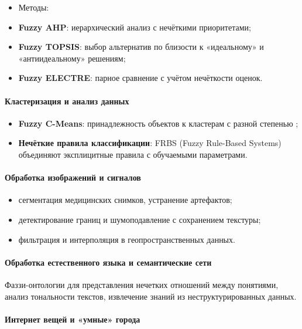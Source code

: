 \begin{itemize}
  \item[] Методы:
  \item \textbf{Fuzzy AHP}: иерархический анализ с нечёткими приоритетами;
  \item \textbf{Fuzzy TOPSIS}: выбор альтернатив по близости к «идеальному» и «антиидеальному» решениям;
  \item \textbf{Fuzzy ELECTRE}: парное сравнение с учётом нечёткости оценок.
\end{itemize}

\paragraph{Кластеризация и анализ данных}
\begin{itemize}
  \item \textbf{Fuzzy C-Means}: принадлежность объектов к кластерам с разной степенью \cite{Bezdek1981};
  \item \textbf{Нечёткие правила классификации}: FRBS (Fuzzy Rule-Based Systems) объединяют эксплицитные правила с обучаемыми параметрами.
\end{itemize}

\paragraph{Обработка изображений и сигналов}
\begin{itemize}
  \item сегментация медицинских снимков, устранение артефактов;
  \item детектирование границ и шумоподавление с сохранением текстуры;
  \item фильтрация и интерполяция в геопространственных данных.
\end{itemize}

\paragraph{Обработка естественного языка и семантические сети}

Фаззи-онтологии для представления нечетких отношений между понятиями, анализ тональности текстов, извлечение знаний из неструктурированных данных.

\paragraph{Интернет вещей и «умные» города}

